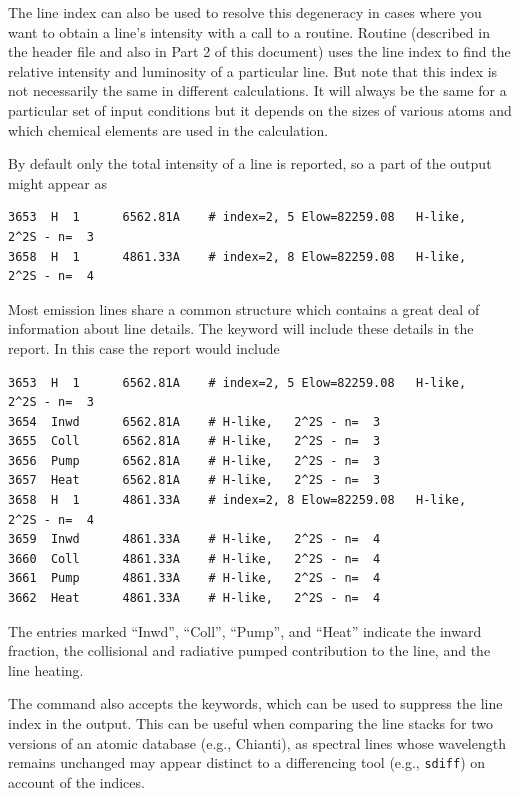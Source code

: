 The line index can also be used
to resolve this degeneracy in cases where you want to obtain a line's
intensity with a call to a routine.
Routine  (described in the
header file  and also in Part 2 of this document)
uses the line index to find the relative intensity and
luminosity of a particular line.
But note that this index is not necessarily the same in different
calculations.  It will always be the same for a particular set of input
conditions but it depends on the sizes of various atoms and which chemical
elements are used in the calculation.

By default only the total intensity of a line is reported, so a
part of the output might appear as
\begin{verbatim}
3653  H  1      6562.81A    # index=2, 5 Elow=82259.08   H-like,   2^2S - n=  3
3658  H  1      4861.33A    # index=2, 8 Elow=82259.08   H-like,   2^2S - n=  4
\end{verbatim}

Most emission lines share a common structure which contains a
great deal of information about line details.  The keyword  
will include these details in the report.  In this case
the report would include
\begin{verbatim}
3653  H  1      6562.81A    # index=2, 5 Elow=82259.08   H-like,   2^2S - n=  3
3654  Inwd      6562.81A    # H-like,   2^2S - n=  3
3655  Coll      6562.81A    # H-like,   2^2S - n=  3
3656  Pump      6562.81A    # H-like,   2^2S - n=  3
3657  Heat      6562.81A    # H-like,   2^2S - n=  3
3658  H  1      4861.33A    # index=2, 8 Elow=82259.08   H-like,   2^2S - n=  4
3659  Inwd      4861.33A    # H-like,   2^2S - n=  4
3660  Coll      4861.33A    # H-like,   2^2S - n=  4
3661  Pump      4861.33A    # H-like,   2^2S - n=  4
3662  Heat      4861.33A    # H-like,   2^2S - n=  4
\end{verbatim}
The entries marked ``Inwd'', ``Coll'', ``Pump'', and ``Heat'' indicate
the inward fraction, the collisional and radiative pumped contribution to
the line, and the line heating.  

The command also accepts the  keywords,
which can be used to suppress the line index in the output.
This can be useful when comparing the line stacks for two versions of an
atomic database (e.g., Chianti), as spectral lines whose wavelength remains
unchanged may appear distinct to a differencing tool (e.g., \texttt{sdiff})
on account of the indices.

